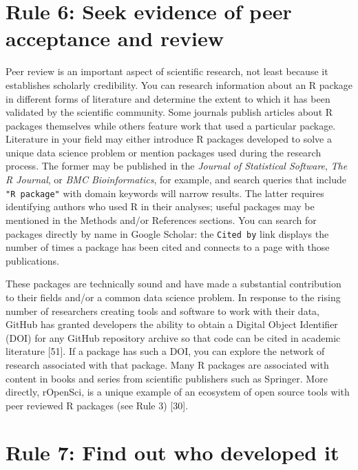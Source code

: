 \documentclass[10pt,letterpaper]{article}
\begin{document}
\hypertarget{rule-6-seek-evidence-of-peer-acceptance-and-review}{%
\section{Rule 6: Seek evidence of peer acceptance and
review}\label{rule-6-seek-evidence-of-peer-acceptance-and-review}}

Peer review is an important aspect of scientific research, not least
because it establishes scholarly credibility. You can research
information about an R package in different forms of literature and
determine the extent to which it has been validated by the scientific
community. Some journals publish articles about R packages themselves
while others feature work that used a particular package. Literature in
your field may either introduce R packages developed to solve a unique
data science problem or mention packages used during the research
process. The former may be published in the \emph{Journal of Statistical
Software}, \emph{The R Journal}, or \emph{BMC Bioinformatics}, for
example, and search queries that include \texttt{"R\ package"} with
domain keywords will narrow results. The latter requires identifying
authors who used R in their analyses; useful packages may be mentioned
in the Methods and/or References sections. You can search for packages
directly by name in Google Scholar: the \texttt{Cited\ by} link displays
the number of times a package has been cited and connects to a page with
those publications.

These packages are technically sound and have made a substantial
contribution to their fields and/or a common data science problem. In
response to the rising number of researchers creating tools and software
to work with their data, GitHub has granted developers the ability to
obtain a Digital Object Identifier (DOI) for any GitHub repository
archive so that code can be cited in academic literature {[}51{]}. If a
package has such a DOI, you can explore the network of research
associated with that package. Many R packages are associated with
content in books and series from scientific publishers such as Springer.
More directly, rOpenSci, is a unique example of an ecosystem of open
source tools with peer reviewed R packages (see Rule 3) {[}30{]}.

\hypertarget{rule-7-find-out-who-developed-it}{%
\section{Rule 7: Find out who developed
it}\label{rule-7-find-out-who-developed-it}}
\end{document}
